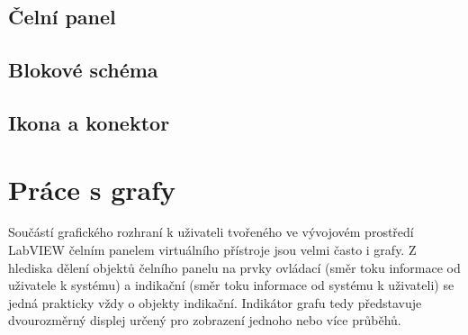    \subsection{Čelní panel}
   \subsection{Blokové schéma}
   \subsection{Ikona a konektor} 
 \section{Práce s grafy}
   Součástí grafického rozhraní k uživateli tvořeného ve vývojovém prostředí LabVIEW čelním panelem
   virtuálního přístroje jsou velmi často i grafy. Z hlediska dělení objektů čelního panelu na prvky
   ovládací (směr toku informace od uživatele k systému) a indikační (směr toku informace od systému
   k uživateli) se jedná prakticky vždy o objekty indikační. Indikátor grafu tedy představuje
   dvourozměrný displej určený pro zobrazení jednoho nebo více průběhů.
   
